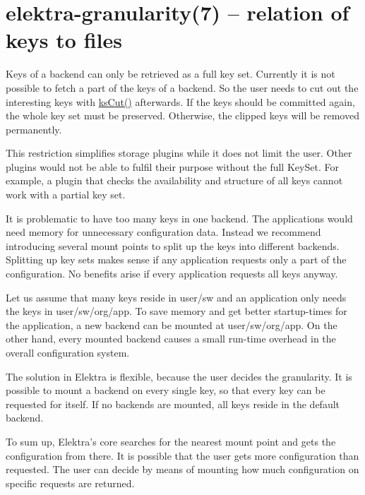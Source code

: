 \section*{elektra-\/granularity(7) -- relation of keys to files }

Keys of a backend can only be retrieved as a full key set. Currently it is not possible to fetch a part of the keys of a backend. So the user needs to cut out the interesting keys with {\ttfamily \hyperlink{group__keyset_ga6b00cf82b59af4d883a9bad6cf4a4a4a}{ks\+Cut()}} afterwards. If the keys should be committed again, the whole key set must be preserved. Otherwise, the clipped keys will be removed permanently.

This restriction simplifies storage plugins while it does not limit the user. Other plugins would not be able to fulfil their purpose without the full {\ttfamily Key\+Set}. For example, a plugin that checks the availability and structure of all keys cannot work with a partial key set.

It is problematic to have too many keys in one backend. The applications would need memory for unnecessary configuration data. Instead we recommend introducing several mount points to split up the keys into different backends. Splitting up key sets makes sense if any application requests only a part of the configuration. No benefits arise if every application requests all keys anyway.

Let us assume that many keys reside in {\ttfamily user/sw} and an application only needs the keys in {\ttfamily user/sw/org/app}. To save memory and get better startup-\/times for the application, a new backend can be mounted at {\ttfamily user/sw/org/app}. On the other hand, every mounted backend causes a small run-\/time overhead in the overall configuration system.

The solution in Elektra is flexible, because the user decides the granularity. It is possible to mount a backend on every single key, so that every key can be requested for itself. If no backends are mounted, all keys reside in the default backend.

To sum up, Elektra’s core searches for the nearest mount point and gets the configuration from there. It is possible that the user gets more configuration than requested. The user can decide by means of mounting how much configuration on specific requests are returned. 